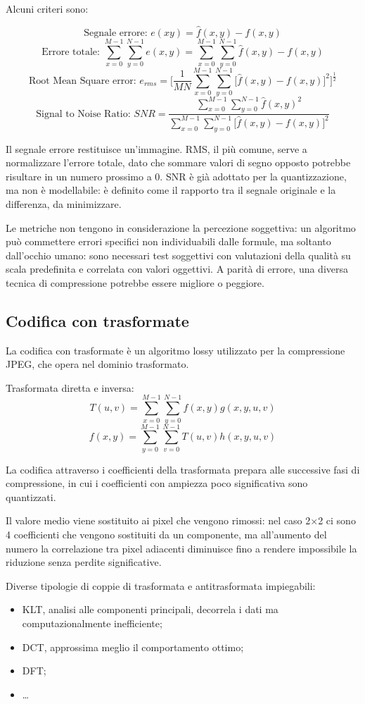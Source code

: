 Alcuni criteri sono:

$$\text{Segnale errore: } e(x y) = \hat{f}(x, y) - f(x, y)$$
\smallskip
$$\text{Errore totale: } \sum_{x=0}^{M-1} \sum_{y=0}^{N-1} e(x, y) = \sum_{x=0}^{M-1} \sum_{y=0}^{N-1} \hat{f}(x, y) - f(x, y)$$
\smallskip
$$\text{Root Mean Square error: } e_{rms} = \Bigg[ \frac{1}{MN} \sum_{x=0}^{M-1} \sum_{y=0}^{N-1} \big[\hat{f}(x, y) - f(x, y)\big]^2\Bigg]^{\frac{1}{2}}$$
\smallskip
$$\text{Signal to Noise Ratio: } SNR = \frac{\sum_{x=0}^{M-1} \sum_{y=0}^{N-1} \hat{f}(x, y)^2}{\sum_{x=0}^{M-1} \sum_{y=0}^{N-1} \big[\hat{f}(x, y) - f(x, y)\big]^2}$$

Il segnale errore restituisce un'immagine. RMS, il più comune, serve a normalizzare l'errore totale, dato che sommare valori di segno opposto potrebbe risultare in un numero prossimo a 0. SNR è già adottato per la quantizzazione, ma non è modellabile: è definito come il rapporto tra il segnale originale e la differenza, da minimizzare.

Le metriche non tengono in considerazione la percezione soggettiva: un algoritmo può commettere errori specifici non individuabili dalle formule, ma soltanto dall'occhio umano: sono necessari test soggettivi con valutazioni della qualità su scala predefinita e correlata con valori oggettivi. A parità di errore, una diversa tecnica di compressione potrebbe essere migliore o peggiore. 

\subsection{Codifica con trasformate}
La codifica con trasformate è un algoritmo lossy utilizzato per la compressione JPEG, che opera nel dominio trasformato. 

Trasformata diretta e inversa:
$$T(u, v) =  \sum_{x=0}^{M-1} \sum_{y=0}^{N-1} f(x, y) g(x, y, u, v)$$
$$f(x, y) = \sum_{y=0}^{M-1} \sum_{v=0}^{N-1} T(u, v) h(x, y, u, v)$$

La codifica attraverso i coefficienti della trasformata prepara alle successive fasi di compressione, in cui i coefficienti con ampiezza poco significativa sono quantizzati.

Il valore medio viene sostituito ai pixel che vengono rimossi: nel caso 2$\times$2 ci sono 4 coefficienti che vengono sostituiti da un componente, ma all'aumento del numero la correlazione tra pixel adiacenti diminuisce fino a rendere impossibile la riduzione senza perdite significative.

Diverse tipologie di coppie di trasformata e antitrasformata impiegabili:
\begin{itemize}
	\item KLT, analisi alle componenti principali, decorrela i dati ma computazionalmente inefficiente;
	\item DCT, approssima meglio il comportamento ottimo; 
	\item DFT;
	\item \dots
\end{itemize}

